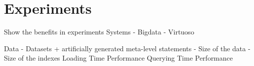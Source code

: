 \section{Experiments}
Show the benefits in experiments
Systems
-	Bigdata
-	Virtuoso

Data
-	Datasets + artificially generated meta-level statements
-	Size of the data
-	Size of the indexes 
Loading Time Performance
Querying Time Performance

